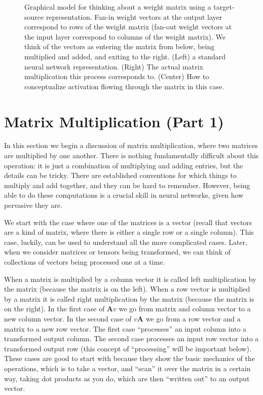 \begin{figure}[h]
\centering
{}
\caption[Jeff Yoshimi.]{Graphical model for thinking about a weight matrix using a target-source representation.  Fan-in weight vectors at the output layer correspond to rows of the weight matrix (fan-out weight vectors at the input layer correspond to columns of the weight matrix). We think of the vectors as entering the matrix from below, being multiplied and added, and exiting to the right. (Left) a standard neural network representation. (Right) The actual matrix multiplication this process corresponds to. (Center) How to conceptualize activation flowing through the matrix in this case. }
\label{targetSourceConvention}
\end{figure}


\section{Matrix Multiplication (Part 1)}\label{matrixProduct1}

In this section we begin a discussion of matrix multiplication, where two matrices are multiplied by one another. There is nothing fundamentally difficult about this operation: it is just a combination of multiplying and adding entries, but the details can be tricky. There are established conventions for which things to multiply and add together, and they can be hard to remember. However, being able to do these computations is a crucial skill in neural networks, given how pervasive they are.

We start with the case where one of the matrices is a vector (recall that vectors are a kind of matrix, where there is either a single row or a single column). This case, luckily, can be used to understand all the more complicated cases. Later, when we consider matrices or tensors being transformed, we can think of collections of vectors being processed one at a time.

When a matrix is multiplied by a column vector it is called left multiplication by the matrix (because the matrix is on the left). When a row vector is multiplied by a matrix it is called right multiplication by the matrix (because the matrix is on the right). In the first case of $\mathbf{A}v$ we go from matrix and column vector to a new column vector. In the second case of $v\mathbf{A}$ we go from a row vector and a matrix to a new row vector. The first case ``processes'' an input column into a transformed output column. The second case processes an input row vector into a transformed output row (this concept of ``processing'' will be important below). These cases are good to start with because they show the basic mechanics of the operations, which is to take a vector, and ``scan'' it over the matrix in a certain way, taking dot products as you do, which are then ``written out'' to an output vector.


